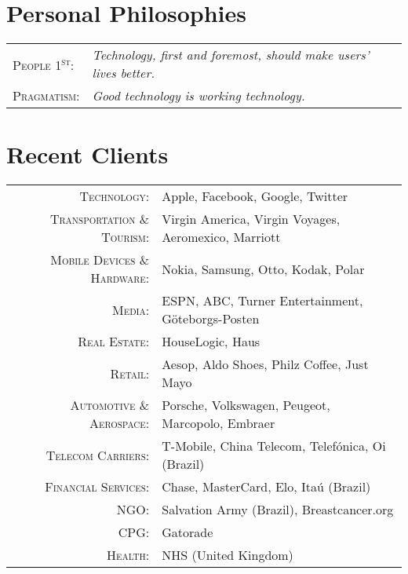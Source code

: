 \documentclass[a4paper,10pt]{article}
\begin{document}
\section{Personal Philosophies}
\begin{tabular}{ll}

  \textsc{People 1\textsuperscript{st}:} & \emph{Technology, first and foremost,
    should make users' lives better.} \\

  \textsc{Pragmatism:} & \emph{Good technology is working technology.}
  
\end{tabular}


\section{Recent Clients}

\begin{tabular}{rl}
  \textsc{Technology:} & Apple, Facebook, Google, Twitter \\
  \textsc{Transportation \& Tourism:} &
    Virgin America,
    Virgin Voyages,
    Aeromexico,
    Marriott \\
\textsc{Mobile Devices \& Hardware:} &

    Nokia,
    Samsung,
    Otto,
    Kodak,
    Polar \\

\textsc{Media:} &

    ESPN,
    ABC,
    Turner Entertainment,
    G\"{o}teborgs-Posten \\

\textsc{Real Estate:} &

    HouseLogic,
    Haus\\

\textsc{Retail:} &

    Aesop,
    Aldo Shoes,
    Philz Coffee,
    Just Mayo\\

\textsc{Automotive \& Aerospace:} &

    Porsche,
    Volkswagen,
    Peugeot,
    Marcopolo,
    Embraer\\

\textsc{Telecom Carriers:} &

    T-Mobile,
    China Telecom,
    Telef\'{o}nica,
    Oi (Brazil)\\

\textsc{Financial Services:} &

    Chase,
    MasterCard,
    Elo,
    Ita\'{u} (Brazil)\\

\textsc{NGO:} &

    Salvation Army (Brazil),
    Breastcancer.org\\
    
\textsc{CPG:} &

    Gatorade\\

\textsc{Health:} &

    NHS (United Kingdom)
\end{tabular}
\end{document}
